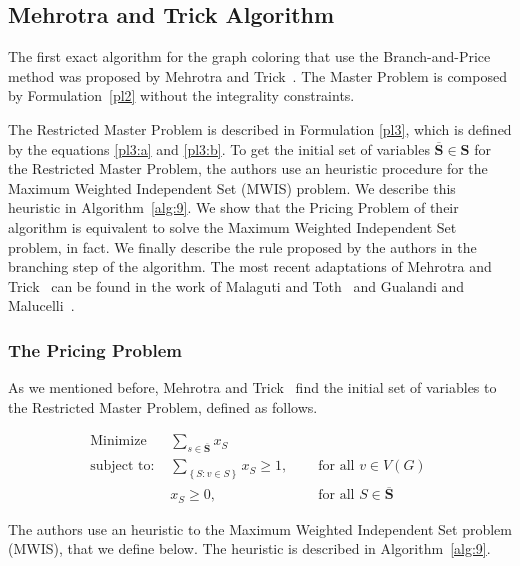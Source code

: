 \documentclass[fleqn,10pt]{SelfArx} %
\newcommand{\chaves}[1] {\ensuremath{{\left \{ {#1} \right \}}}}
\begin{document}
	\subsection{Mehrotra and Trick Algorithm}
	
	The first exact algorithm for the graph coloring that use the
	Branch-and-Price method was proposed by Mehrotra and Trick~\cite{Mehrotra95}. The Master Problem is composed by Formulation~\eqref{pl2} without the integrality constraints.
	
	The Restricted Master Problem is described in Formulation \eqref{pl3}, which is defined by the equations \eqref{pl3:a} and \eqref{pl3:b}. To get the initial set of variables $\overline{\textbf{S}} \in
	\textbf{S}$ for the Restricted Master Problem, the authors use an heuristic procedure for the Maximum Weighted Independent
	Set (MWIS) problem. We describe this heuristic in Algorithm~\ref{alg:9}. We show that the Pricing Problem of their algorithm
	is equivalent to solve the Maximum Weighted Independent Set problem,
	in fact. We finally describe the rule proposed by the authors in the branching step of the algorithm. The most recent adaptations of Mehrotra and Trick~\cite{Mehrotra95} can be found in the work of Malaguti and Toth~\cite{Malaguti2010} and Gualandi and Malucelli~\cite{Gualandi2010}.
	
	\subsubsection{The Pricing Problem}
	
	As we mentioned before, Mehrotra and Trick~\cite{Mehrotra95} find the initial set
	of variables to the Restricted Master Problem, defined as follows.
	
	\begin{subequations}\label{pl3}
		\begin{align}
		\text{Minimize } & \displaystyle\sum_{s \in \boldsymbol{\overline{S}}} x_S &\label{pl3:a}\ \\
		\text{subject to: } & \displaystyle\sum_{\chaves{S:v \in S}} x_S \geq 1, &&\text{ for all } v \in V(G)\label{pl3:b}\ \\
		& x_S \geq 0, && \text{ for all } S \in \overline{\textbf{S}}\nonumber
		\end{align}
	\end{subequations}
	
	The authors use an heuristic to the Maximum Weighted Independent Set problem
	(MWIS), that we define below. The heuristic is described in Algorithm~\ref{alg:9}.
	
\end{document}
